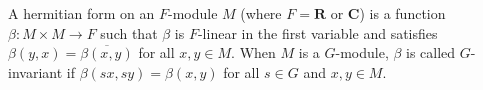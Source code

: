 A hermitian form on an $F$-module $M$ (where $F = \mathbf{R}$ or $\mathbf{C}$) is a function $\beta: M \times M \rightarrow F$ such that $\beta$ is $F$-linear in the first variable and satisfies $\beta(y, x) = \overline{\beta(x, y)}$ for all $x, y \in M$. When $M$ is a $G$-module, $\beta$ is called $G$-invariant if $\beta(sx, sy) = \beta(x, y)$ for all $s \in G$ and $x, y \in M$.
